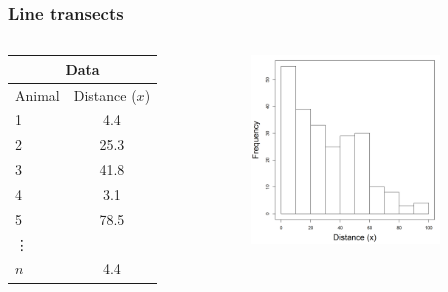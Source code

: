 \documentclass[color=usenames,dvipsnames,handout]{beamer}\usepackage[]{graphicx}\usepackage[]{xcolor}
\begin{document}
\begin{frame}
  \frametitle{Line transects}
  \begin{columns}
    \begin{column}{0.4\textwidth}
      \centering
      \normalsize
      \begin{tabular}{lc}
        \hline
        \multicolumn{2}{c}{Data} \\
        \hline
        Animal & Distance ($x$) \\
        \hline
        1 & 4.4 \\
        2 & 25.3 \\
        3 & 41.8 \\
        4 & 3.1 \\
        5 & 78.5 \\
        \vdots \\
        $n$ & 4.4 \\
        \hline
      \end{tabular}
    \end{column}
    \begin{column}{0.6\textwidth}
      \centering
      \includegraphics[width=5cm]{figs/example1}
    \end{column}
  \end{columns}

\end{frame}
\end{document}
